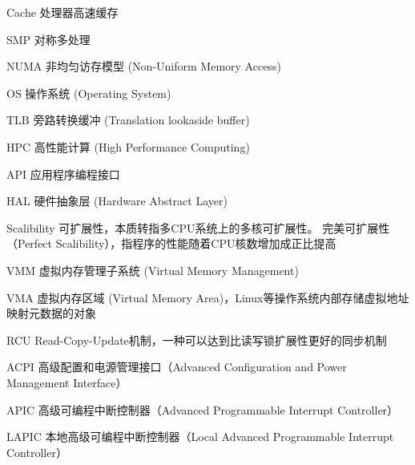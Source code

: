 \begin{denotation}

\item[Cache] 处理器高速缓存
\item[SMP] 对称多处理
\item[NUMA] 非均匀访存模型 (Non-Uniform Memory Access)
\item[OS] 操作系统 (Operating System)
\item[TLB] 旁路转换缓冲 (Translation lookaside buffer)
\item[HPC] 高性能计算 (High Performance Computing)
\item[API] 应用程序编程接口
\item[HAL] 硬件抽象层 (Hardware Abstract Layer)
\item[Scalibility] 可扩展性，本质转指多CPU系统上的多核可扩展性。
	完美可扩展性（Perfect Scalibility），指程序的性能随着CPU核数增加成正比提高
\item[VMM] 虚拟内存管理子系统 (Virtual Memory Management)
\item[VMA] 虚拟内存区域 (Virtual Memory
	Area)，Linux等操作系统内部存储虚拟地址映射元数据的对象
\item[RCU]
	Read-Copy-Update机制，一种可以达到比读写锁扩展性更好的同步机制
\item[ACPI] 高级配置和电源管理接口（Advanced Configuration and Power Management Interface）
\item[APIC] 高级可编程中断控制器（Advanced Programmable Interrupt Controller）
\item[LAPIC] 本地高级可编程中断控制器（Local Advanced Programmable Interrupt Controller）
\end{denotation}
